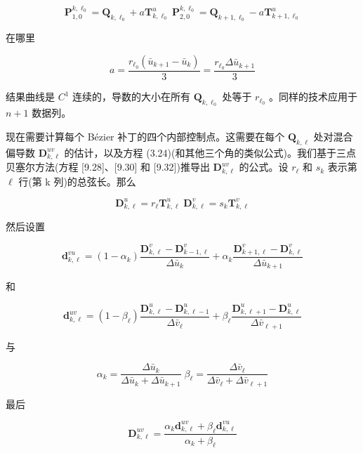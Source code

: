 \documentclass[../main.tex]{subfiles}
\begin{document}
\[
{\mathbf{P}}_{1,0}^{k,{\ell }_{0}} = {\mathbf{Q}}_{k,{\ell }_{0}} + a{\mathbf{T}}_{k,{\ell }_{0}}^{u}\;{\mathbf{P}}_{2,0}^{k,{\ell }_{0}} = {\mathbf{Q}}_{k + 1,{\ell }_{0}} - a{\mathbf{T}}_{k + 1,{\ell }_{0}}^{u} \tag{9.57}
\]



在哪里

\[
a = \frac{{r}_{{\ell }_{0}}\left( {{\bar{u}}_{k + 1} - {\bar{u}}_{k}}\right) }{3} = \frac{{r}_{{\ell }_{0}}\Delta {\bar{u}}_{k + 1}}{3}
\]

结果曲线是 \({C}^{1}\) 连续的，导数的大小在所有 \({\mathbf{Q}}_{k,{\ell }_{0}}\) 处等于 \({r}_{{\ell }_{0}}\) 。同样的技术应用于 \(n + 1\) 数据列。

现在需要计算每个 Bézier 补丁的四个内部控制点。这需要在每个 \({\mathbf{Q}}_{k,\ell }\) 处对混合偏导数 \({\mathbf{D}}_{k,\ell }^{uv}\) 的估计，以及方程 (3.24)(和其他三个角的类似公式)。我们基于三点贝塞尔方法(方程 [9.28]、[9.30] 和 [9.32])推导出 \({\mathbf{D}}_{k,\ell }^{uv}\) 的公式。设 \({r}_{\ell }\) 和 \({s}_{k}\) 表示第 \(\ell\) 行(第 k 列)的总弦长。那么

\[
{\mathbf{D}}_{k,\ell }^{u} = {r}_{\ell }{\mathbf{T}}_{k,\ell }^{u}\;{\mathbf{D}}_{k,\ell }^{v} = {s}_{k}{\mathbf{T}}_{k,\ell }^{v} \tag{9.58}
\]

然后设置

\[
{\mathbf{d}}_{k,\ell }^{vu} = \left( {1 - {\alpha }_{k}}\right) \frac{{\mathbf{D}}_{k,\ell }^{v} - {\mathbf{D}}_{k - 1,\ell }^{v}}{\Delta {\bar{u}}_{k}} + {\alpha }_{k}\frac{{\mathbf{D}}_{k + 1,\ell }^{v} - {\mathbf{D}}_{k,\ell }^{v}}{\Delta {\bar{u}}_{k + 1}}
\]

和

\[
{\mathbf{d}}_{k,\ell }^{uv} = \left( {1 - {\beta }_{\ell }}\right) \frac{{\mathbf{D}}_{k,\ell }^{u} - {\mathbf{D}}_{k,\ell  - 1}^{u}}{\Delta {\bar{v}}_{\ell }} + {\beta }_{\ell }\frac{{\mathbf{D}}_{k,\ell  + 1}^{u} - {\mathbf{D}}_{k,\ell }^{u}}{\Delta {\bar{v}}_{\ell  + 1}}
\]

与

\[
{\alpha }_{k} = \frac{\Delta {\bar{u}}_{k}}{\Delta {\bar{u}}_{k} + \Delta {\bar{u}}_{k + 1}}\;{\beta }_{\ell } = \frac{\Delta {\bar{v}}_{\ell }}{\Delta {\bar{v}}_{\ell } + \Delta {\bar{v}}_{\ell  + 1}}
\]

最后

\[
{\mathbf{D}}_{k,\ell }^{uv} = \frac{{\alpha }_{k}{\mathbf{d}}_{k,\ell }^{uv} + {\beta }_{\ell }{\mathbf{d}}_{k,\ell }^{vu}}{{\alpha }_{k} + {\beta }_{\ell }} \tag{9.59}
\]
\end{document}
